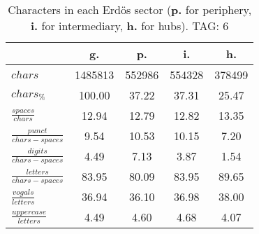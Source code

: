 \begin{table}[h!]
\begin{center}
\begin{tabular}{| l | c | c | c | c |}\hline
 & g. & p. & i. & h. \\\hline
$chars$ & 1485813  & 552986  & 554328  & 378499 \\\hline
$chars_{\%}$ & 100.00  & 37.22  & 37.31  & 25.47 \\\hline
$\frac{spaces}{chars}$ & 12.94  & 12.79  & 12.82  & 13.35 \\\hline
$\frac{punct}{chars-spaces}$ & 9.54  & 10.53  & 10.15  & 7.20 \\\hline
$\frac{digits}{chars-spaces}$ & 4.49  & 7.13  & 3.87  & 1.54 \\\hline
$\frac{letters}{chars-spaces}$ & 83.95  & 80.09  & 83.95  & 89.65 \\\hline
$\frac{vogals}{letters}$ & 36.94  & 36.10  & 36.98  & 38.00 \\\hline
$\frac{uppercase}{letters}$ & 4.49  & 4.60  & 4.68  & 4.07 \\\hline
\end{tabular}
\caption{Characters in each Erd\"os sector ({{\bf p.}} for periphery, {{\bf i.}} for intermediary, 
    {{\bf h.}} for hubs). TAG: 6}
\end{center}
\end{table}